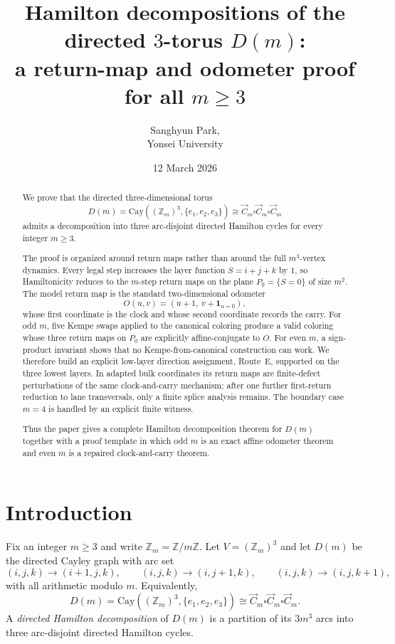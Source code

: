 \documentclass[11pt]{article}
\title{Hamilton decompositions of the directed $3$-torus $D(m)$:\\
a return-map and odometer proof for all $m\ge 3$}
\author{Sanghyun Park, \\ Yonsei University}
\date{12 March 2026}
\begin{document}
\maketitle

\begin{abstract}
We prove that the directed three-dimensional torus
\[
D(m)=\mathrm{Cay}((\mathbb Z_m)^3,\{e_1,e_2,e_3\})\cong \vec C_m\square \vec C_m\square \vec C_m
\]
admits a decomposition into three arc-disjoint directed Hamilton cycles for every integer $m\ge 3$.

The proof is organized around return maps rather than around the full $m^3$-vertex dynamics.
Every legal step increases the layer function $S=i+j+k$ by $1$, so Hamiltonicity reduces to the $m$-step return maps on the plane $P_0=\{S=0\}$ of size $m^2$.
The model return map is the standard two-dimensional odometer
\[
O(u,v)=(u+1,\ v+\mathbf 1_{u=0}),
\]
whose first coordinate is the clock and whose second coordinate records the carry.
For odd $m$, five Kempe swaps applied to the canonical coloring produce a valid coloring whose three return maps on $P_0$ are explicitly affine-conjugate to $O$.
For even $m$, a sign-product invariant shows that no Kempe-from-canonical construction can work.
We therefore build an explicit low-layer direction assignment, Route~E, supported on the three lowest layers.
In adapted bulk coordinates its return maps are finite-defect perturbations of the same clock-and-carry mechanism; after one further first-return reduction to lane transversals, only a finite splice analysis remains.
The boundary case $m=4$ is handled by an explicit finite witness.

Thus the paper gives a complete Hamilton decomposition theorem for $D(m)$ together with a proof template in which odd $m$ is an exact affine odometer theorem and even $m$ is a repaired clock-and-carry theorem.
\end{abstract}


\section{Introduction}

Fix an integer $m\ge 3$ and write $\mathbb Z_m=\mathbb Z/m\mathbb Z$.
Let $V=(\mathbb Z_m)^3$ and let $D(m)$ be the directed Cayley graph with arc set
\[
(i,j,k)\to(i+1,j,k),\qquad (i,j,k)\to(i,j+1,k),\qquad (i,j,k)\to(i,j,k+1),
\]
with all arithmetic modulo $m$.
Equivalently,
\[
D(m)=\mathrm{Cay}((\mathbb Z_m)^3,\{e_1,e_2,e_3\})\cong \vec C_m\square \vec C_m\square \vec C_m.
\]
A \emph{directed Hamilton decomposition} of $D(m)$ is a partition of its $3m^3$ arcs into three arc-disjoint directed Hamilton cycles.
\end{document}
